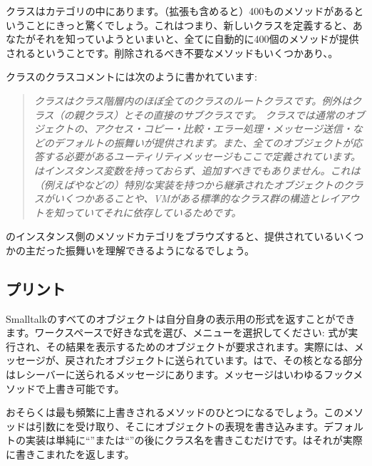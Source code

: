 \documentclass[a4paper,10pt,twoside]{book}
\begin{document}
クラスはカテゴリの中にあります。（拡張も含めると）400ものメソッドがあるということにきっと驚くでしょう。これはつまり、新しいクラスを定義すると、あなたがそれを知っていようといまいと、全てに自動的に400個のメソッドが提供されるということです。削除されるべき不要なメソッドもいくつかあり、。

クラスのクラスコメントには次のように書かれています:

\begin{quote}
\textit{クラスはクラス階層内のほぼ全てのクラスのルートクラスです。例外はクラス（の親クラス）とその直接のサブクラスです。
クラスでは通常のオブジェクトの、アクセス・コピー・比較・エラー処理・メッセージ送信・などのデフォルトの振舞いが提供されます。また、全てのオブジェクトが応答する必要があるユーティリティメッセージもここで定義されています。
はインスタンス変数を持っておらず、追加すべきでもありません。これは（例えばやなどの）特別な実装を持つから継承されたオブジェクトのクラスがいくつかあることや、VMがある標準的なクラス群の構造とレイアウトを知っていてそれに依存しているためです。
}
\end{quote}

のインスタンス側のメソッドカテゴリをブラウズすると、提供されているいくつかの主だった振舞いを理解できるようになるでしょう。

\subsection{プリント}
Smalltalkのすべてのオブジェクトは自分自身の表示用の形式を返すことができます。ワークスペースで好きな式を選び、メニューを選択してください: 式が実行され、その結果を表示するためのオブジェクトが要求されます。実際には、メッセージが、戻されたオブジェクトに送られています。はで、その核となる部分はレシーバーに送られるメッセージにあります。メッセージはいわゆるフックメソッドで上書き可能です。

おそらくは最も頻繁に上書きされるメソッドのひとつになるでしょう。このメソッドは引数にを受け取り、そこにオブジェクトの表現を書き込みます。デフォルトの実装は単純に``''または``''の後にクラス名を書きこむだけです。はそれが実際に書きこまれたを返します。
\end{document}
